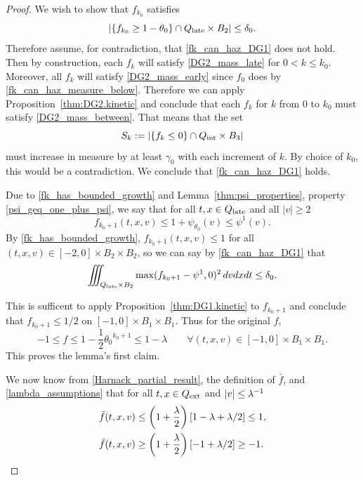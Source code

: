 \begin{proof}
We wish to show that $f_{k_0}$ satisfies
\begin{equation}\label{fk_can_haz_DG1}
|\{f_{k_0} \geq 1-{\theta_0}\}\cap {Q_\textrm{late}} \times B_2| \leq \delta_0. 
\end{equation}
Therefore assume, for contradiction, that \eqref{fk_can_haz_DG1} does not hold.  Then by construction, each $f_k$ will satisfy \eqref{DG2_mass_late} for $0 < k \leq k_0$.  Moreover, all $f_k$ will satisfy \eqref{DG2_mass_early} since $f_0$ does by \eqref{fk_can_haz_measure_below}.  Therefore we can apply Proposition~\ref{thm:DG2.kinetic} and conclude that each $f_k$ for $k$ from 0 to $k_0$ must satisfy \eqref{DG2_mass_between}.  That means that the set
\[ S_k := |\{f_k \leq 0\} \cap {Q_\textrm{int}} \times B_3| \]
must increase in measure by at least $\gamma_0$ with each increment of $k$.  By choice of $k_0$, this would be a contradiction.  We conclude that \eqref{fk_can_haz_DG1} holds.  

Due to \eqref{fk_has_bounded_growth} and Lemma~\ref{thm:psi_properties}, property \eqref{psi_geq_one_plus_psi}, we say that for all $t,x \in {Q_\textrm{late}}$ and all $|v| \geq 2$
\[ f_{k_0+1}(t,x,v) \leq 1 + \psi_{\theta_0}(v) \leq \psi^1(v). \]
By \eqref{fk_has_bounded_growth}, $f_{k_0+1}(t,x,v) \leq 1$ for all $(t,x,v) \in [-2,0]\times B_2 \times B_2$, so we can say by \eqref{fk_can_haz_DG1} that
\[ \iiint_{{Q_\textrm{late}} \times B_2} \max(f_{k_0+1}-\psi^1,0)^2 \,dvdxdt \leq \delta_0. \]

This is sufficent to apply Proposition~\ref{thm:DG1.kinetic} to $f_{k_0+1}$ and conclude that $ f_{k_0+1} \leq 1/2$ on $[-1,0]\times B_1 \times B_1$.  Thus for the original $f$,
\begin{equation}\label{Harnack_partial_result} 
-1 \leq f \leq 1-\frac{1}{2} {\theta_0}^{k_0+1} \leq 1-\lambda \qquad \forall (t,x,v)\in [-1,0]\times B_1 \times B_1. 
\end{equation}
This proves the lemma's first claim.  

We now know from \eqref{Harnack_partial_result}, the definition of $\bar{f}$, and \eqref{lambda_assumptions} that for all $t,x \in {Q_\textrm{ext}}$ and $|v| \leq \lambda^{-1}$
\begin{align*}
\bar{f}(t,x,v) &\leq \left( 1+\frac{\lambda}{2} \right) \left[  1 - \lambda + \lambda/2 \right] \leq 1, \\
\bar{f}(t,x,v) &\geq \left( 1+\frac{\lambda}{2} \right) \left[ -1 + \lambda/2 \right] \geq -1.
\end{align*}


\end{proof}
